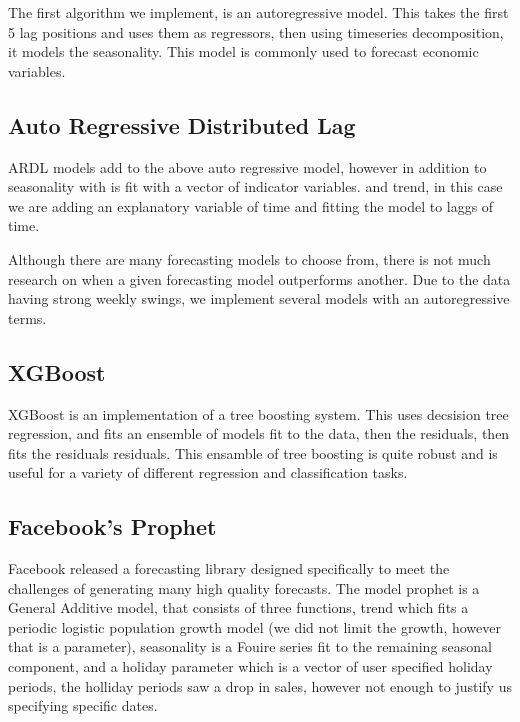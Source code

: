 \documentclass[16pt,twocolumn,letterpaper]{article}
\begin{document}
The first algorithm we implement, is an autoregressive model. This takes the first 5 lag positions and uses them as regressors, then using timeseries decomposition, it models the seasonality\cite{hamilton1994}. This model is commonly used to forecast economic variables.

\subsection{Auto Regressive Distributed Lag}

ARDL models add to the above auto regressive model, however in addition to seasonality with is fit with a vector of indicator variables. and trend, in this case we are adding an explanatory variable of time and fitting the model to laggs of time.

Although there are many forecasting models to choose from, there is not much research on when a given forecasting model outperforms another. Due to the data having strong weekly swings, we implement several models with an autoregressive terms.


\subsection{XGBoost}

XGBoost is an implementation of a tree boosting system. This uses decsision tree regression, and fits an ensemble of models fit to the data, then the residuals, then fits the residuals residuals. This ensamble of tree boosting is quite robust and is useful for a variety of different regression and classification tasks\cite{chen2015xgboost}.

\subsection{Facebook's Prophet}

Facebook released a forecasting library designed specifically to meet the challenges of generating many high quality forecasts. The model prophet is a General Additive model, that consists of three functions, trend which fits a periodic logistic population growth model (we did not limit the growth, however that is a parameter), seasonality is a Fouire series fit to the remaining seasonal component, and a holiday parameter which is a vector of user specified holiday periods, the holliday periods saw a drop in sales, however not enough to justify us specifying specific dates\cite{taylor2018forecasting}. 
\end{document}

